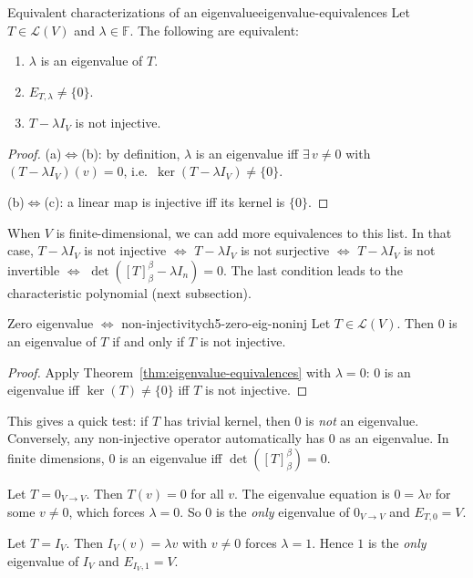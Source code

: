 \begin{theorem}{Equivalent characterizations of an eigenvalue}{eigenvalue-equivalences}
Let $T\in\mathcal{L}(V)$ and $\lambda\in\mathbb{F}$. The following are equivalent:
\begin{enumerate}[label=(\alph*),leftmargin=*]
\item $\lambda$ is an eigenvalue of $T$.
\item $E_{T,\lambda}\neq\{0\}$.
\item $T-\lambda I_V$ is not injective.
\end{enumerate}
\end{theorem}

\begin{proof}
(a)$\Leftrightarrow$(b): by definition, $\lambda$ is an eigenvalue iff $\exists\,v\neq 0$ with $(T-\lambda I_V)(v)=0$, i.e.\ $\ker(T-\lambda I_V)\neq\{0\}$.

(b)$\Leftrightarrow$(c): a linear map is injective iff its kernel is $\{0\}$.
\end{proof}

When $V$ is finite-dimensional, we can add more equivalences to this list.
In that case, $T-\lambda I_V$ is not injective $\Leftrightarrow$ $T-\lambda I_V$ is not surjective $\Leftrightarrow$ $T-\lambda I_V$ is not invertible $\Leftrightarrow$ $\det([T]_\beta^\beta - \lambda I_n)=0$.
The last condition leads to the characteristic polynomial (next subsection).

\begin{theorem}{Zero eigenvalue $\Leftrightarrow$ non-injectivity}{ch5-zero-eig-noninj}
Let $T\in\mathcal{L}(V)$. Then $0$ is an eigenvalue of $T$ if and only if $T$ is not injective.
\end{theorem}

\begin{proof}
Apply Theorem~\ref{thm:eigenvalue-equivalences} with $\lambda=0$: $0$ is an eigenvalue iff $\ker(T)\neq\{0\}$ iff $T$ is not injective.
\end{proof}

This gives a quick test: if $T$ has trivial kernel, then $0$ is \emph{not} an eigenvalue.
Conversely, any non-injective operator automatically has $0$ as an eigenvalue.
In finite dimensions, $0$ is an eigenvalue iff $\det([T]_\beta^\beta)=0$.

\begin{examplebox}[title={Worked Example (Lecture Week 9): eigenvalues of $0_{V\to V}$ and $I_V$}]
Let $T=0_{V\to V}$. Then $T(v)=0$ for all $v$. The eigenvalue equation is $0=\lambda v$ for some $v\neq 0$, which forces $\lambda=0$.
So $0$ is the \emph{only} eigenvalue of $0_{V\to V}$ and $E_{T,0}=V$.

Let $T=I_V$. Then $I_V(v)=\lambda v$ with $v\neq 0$ forces $\lambda=1$. Hence $1$ is the \emph{only} eigenvalue of $I_V$ and $E_{I_V,1}=V$.
\end{examplebox}

